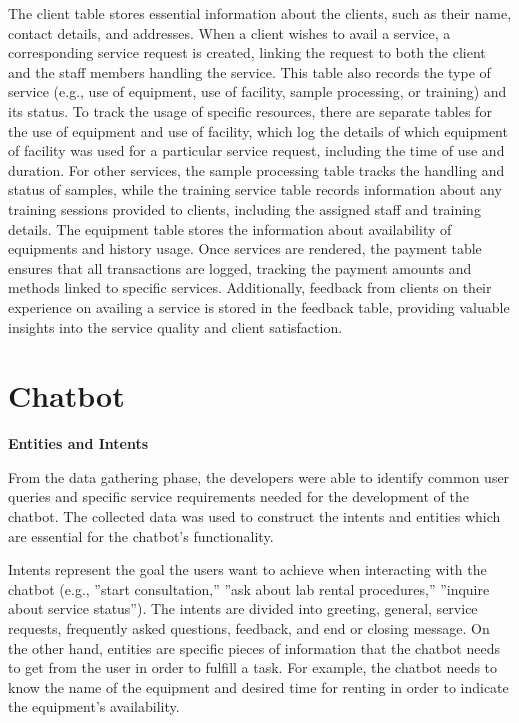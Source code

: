 The client table stores essential information about the clients, such as their name, contact details, and addresses. When a client wishes to avail a service, a corresponding service request is created, linking the request to both the client and the staff members handling the service. This table also records the type of service (e.g., use of equipment, use of facility, sample processing, or training) and its status. To track the usage of specific resources, there are separate tables for the use of equipment and use of facility, which log the details of which equipment of facility was used for a particular service request, including the time of use and duration. For other services, the sample processing table tracks the handling and status of samples, while the training service table records information about any training sessions provided to clients, including the assigned staff and training details. The equipment table stores the information about availability of equipments and history usage. Once services are rendered, the payment table ensures that all transactions are logged, tracking the payment amounts and methods linked to specific services. Additionally, feedback from clients on their experience on availing a service is stored in the feedback table, providing valuable insights into the service quality and client satisfaction.

\newpage

\section{Chatbot}

\textbf{Entities and Intents}

From the data gathering phase, the developers were able to identify common user queries and specific service requirements needed for the development of the chatbot. The collected data was used to construct the intents and entities which are essential for the chatbot’s functionality. 

Intents represent the goal the users want to achieve when interacting with the chatbot (e.g., ”start consultation,” ”ask about lab rental procedures,” ”inquire about service status”). The intents are divided into greeting, general, service requests, frequently asked questions, feedback, and end or closing message. On the other hand, entities are specific pieces of information that the chatbot needs to get from the user in order to fulfill a task. For example, the chatbot needs to know the name of the equipment and desired time for renting in order to indicate the equipment's availability. 

